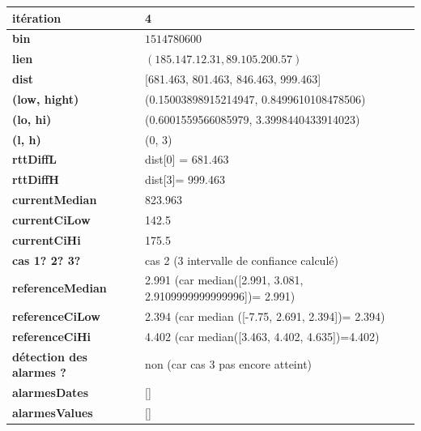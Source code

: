 \begin{table}[H]
	\centering
	
	\begin{tabularx}{\linewidth}{|l|X| }
		\hline
		\textbf{itération} & 4	\\ \hline
		\textbf{bin} & $1514780600$ \\ \hline
		\textbf{lien} & $(185.147.12.31, 89.105.200.57)$  \\ \hline
		\textbf{dist}& [681.463, 801.463, 846.463, 999.463]	\\ \hline
		\textbf{(low, hight)}& (0.15003898915214947, 0.8499610108478506) 	\\ \hline
		\textbf{(lo, hi)}&(0.6001559566085979, 3.3998440433914023)  \\ \hline
		\textbf{(l, h)} & (0, 3) 	\\ \hline
		\textbf{rttDiffL}& dist[0] = 681.463	\\ \hline
		\textbf{rttDiffH}& dist[3]= 999.463	\\ \hline
		\textbf{currentMedian}& 823.963	\\ \hline
		\textbf{currentCiLow}& 142.5 	\\ \hline
		\textbf{currentCiHi}& 175.5	\\ \hline
		\textbf{cas 1? 2? 3?}& cas 2 (3 intervalle de confiance calculé)  \\ \hline
		\textbf{referenceMedian}& 2.991 (car median([2.991, 3.081, 2.9109999999999996])= 2.991)	\\ \hline
		\textbf{referenceCiLow}& 2.394 (car median ([-7.75, 2.691, 2.394])= 2.394)	\\ \hline
		\textbf{referenceCiHi}& 4.402 (car median([3.463, 4.402, 4.635])=4.402)	\\ \hline
		\textbf{détection des alarmes ?}& non (car cas 3 pas  encore atteint)	\\ \hline
		\textbf{alarmesDates}& []	\\ \hline
		\textbf{alarmesValues}& []	\\ \hline
		
	\end{tabularx}
\end{table}







